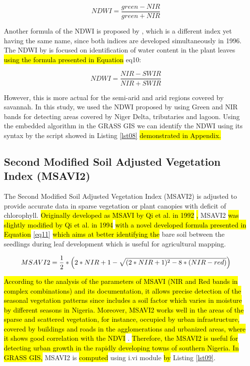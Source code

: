 \documentclass[jmse,article,submit,pdftex,moreauthors]{Definitions/mdpi}
\begin{document}
\begin{equation}\label{eq9}
	NDWI = \frac{green - NIR}{green + NIR}
\end{equation} 

Another formula of the NDWI is proposed by \cite{GAO1996257}, which is a different index yet having the same name, since both indices are developed simultaneously in 1996. The NDWI by \cite{GAO1996257} is focused on identification of water content in the plant leaves \hl{using the formula presented in Equation }{eq10}: 

\begin{equation}\label{eq10}
	NDWI = \frac{NIR - SWIR}{NIR + SWIR}
\end{equation} 

However, this is more actual for the semi-arid and arid regions covered by savannah. In this study, we used the NDWI proposed by \cite{McFeeters} using Green and NIR bands for detecting areas covered by Niger Delta, tributaries and lagoon.  Using the embedded algorithm in the GRASS GIS we can identify the NDWI using its syntax by the script showed in Listing \ref{lst08}\hl{ demonstrated in Appendix.}

\subsection{Second Modified Soil Adjusted Vegetation Index (MSAVI2)}

The Second Modified Soil Adjusted Vegetation Index (MSAVI2) is adjusted to provide accurate data in sparse vegetation or plant canopies with deficit of chlorophyll. \hl{Originally developed as MSAVI by Qi et al. in 1992 }\cite{QI1994119}\hl{, }MSAVI2 \hl{was slightly modified by Qi et al. in 1994 }\cite{Qi1994ExternalFC} \hl{with a novel developed formula presented in Equation }\ref{eq11} \hl{which aims at better identifying the }bare soil between the seedlings during leaf development which is useful for agricultural mapping. 

\begin{equation}\label{eq11}
	MSAVI2 = \frac{1}{2}*\Bigl(2*NIR+1-\sqrt{(2*NIR+1)^2-8*(NIR-red)}\Bigr)
\end{equation} 

\hl{According to the analysis of the parameters of MSAVI (NIR and Red bands in complex combinations) and its documentation, it allows precise detection of the seasonal vegetation patterns since includes a soil factor which varies in moisture by different seasons in Nigeria. Moreover, MSAVI2 works well in the areas of the sparse and scattered vegetation, for instance, occupied by urban infrastructure, covered by buildings and roads in the agglomerations and urbanized areas, where it shows good correlation with the NDVI} \cite{FABIJANCZYK2022100721}. \hl{Therefore, the MSAVI2 is useful for detecting urban growth in the rapidly developing towns of southern Nigeria. In GRASS GIS,} MSAVI2 is \hl{computed} using i.vi module \hl{by} Listing \ref{lst09}.
\end{document}
